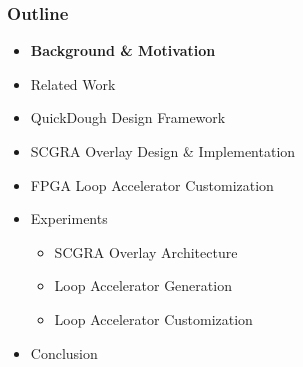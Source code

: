 \documentclass[accentcolor=tud1a,colorbacktitle,inverttitle,landscape,german,presentation,t]{tudbeamer}
\begin{document}
  \begin{frame}
  \frametitle{Outline}
  \begin{itemize}
  \setlength{\itemsep}{6pt}
  \item \textbf{Background \& Motivation}
  \item Related Work
  \item QuickDough Design Framework
  \item SCGRA Overlay Design \& Implementation
  \item FPGA Loop Accelerator Customization
  \item Experiments
  \begin{itemize}
    \setlength{\itemsep}{6pt}
    \item SCGRA Overlay Architecture
    \item Loop Accelerator Generation
    \item Loop Accelerator Customization
  \end{itemize}
  \item Conclusion
  \end{itemize}
  \end{frame}
\end{document}
